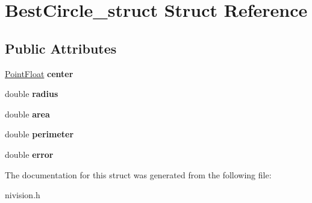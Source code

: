 \hypertarget{structBestCircle__struct}{\section{\-Best\-Circle\-\_\-struct \-Struct \-Reference}
\label{structBestCircle__struct}
}
\subsection*{\-Public \-Attributes}
\begin{DoxyCompactItemize}
\item 
\hypertarget{structBestCircle__struct_a36a9e0f07cf600ccb57bb15657012fa4}{\hyperlink{structPointFloat__struct}{\-Point\-Float} {\bfseries center}}\label{structBestCircle__struct_a36a9e0f07cf600ccb57bb15657012fa4}

\item 
\hypertarget{structBestCircle__struct_a947597e94aac3917ebd8a64faa31f806}{double {\bfseries radius}}\label{structBestCircle__struct_a947597e94aac3917ebd8a64faa31f806}

\item 
\hypertarget{structBestCircle__struct_a2d90442b14fd7c0a40b6fe18a5803e57}{double {\bfseries area}}\label{structBestCircle__struct_a2d90442b14fd7c0a40b6fe18a5803e57}

\item 
\hypertarget{structBestCircle__struct_a51fd331f9844e9345a0c91e4bad15d87}{double {\bfseries perimeter}}\label{structBestCircle__struct_a51fd331f9844e9345a0c91e4bad15d87}

\item 
\hypertarget{structBestCircle__struct_a17c691fd999fd990c3f5c03a9315a699}{double {\bfseries error}}\label{structBestCircle__struct_a17c691fd999fd990c3f5c03a9315a699}

\end{DoxyCompactItemize}


\-The documentation for this struct was generated from the following file\-:\begin{DoxyCompactItemize}
\item 
nivision.\-h\end{DoxyCompactItemize}
